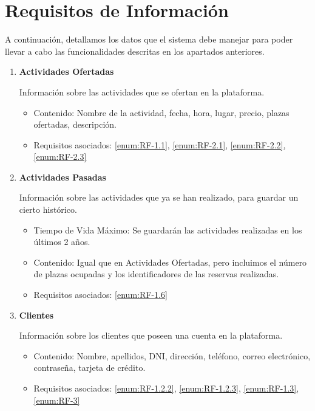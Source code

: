 \section{Requisitos de Información}



A continuación, detallamos los datos que el sistema debe manejar para poder llevar a cabo las funcionalidades descritas en los apartados anteriores.
\begin{enumerate}[label={\color{red}RI-\arabic{enumi}.}]
    \item \textbf{Actividades Ofertadas}
    
    Información sobre las actividades que se ofertan en la plataforma.
    \begin{itemize}
        \item {\color{violet}Contenido:} Nombre de la actividad, fecha, hora, lugar, precio, plazas ofertadas, descripción.
        \item {\color{violet}Requisitos asociados:} \ref{enum:RF-1.1}, \ref{enum:RF-2.1}, \ref{enum:RF-2.2}, \ref{enum:RF-2.3}
    \end{itemize}
    
    \item \textbf{Actividades Pasadas}
    
    Información sobre las actividades que ya se han realizado, para guardar un cierto histórico.
    \begin{itemize}
        \item {\color{violet}Tiempo de Vida Máximo:} Se guardarán las actividades realizadas en los últimos 2 años.
        \item {\color{violet}Contenido:} Igual que en Actividades Ofertadas, pero incluimos el número de plazas ocupadas y los identificadores de las reservas realizadas.
        \item {\color{violet}Requisitos asociados:} \ref{enum:RF-1.6}
    \end{itemize}

    \item \textbf{Clientes}
    
    Información sobre los clientes que poseen una cuenta en la plataforma.
    \begin{itemize}
        \item {\color{violet}Contenido:} Nombre, apellidos, DNI, dirección, teléfono, correo electrónico, contraseña, tarjeta de crédito.
        \item {\color{violet}Requisitos asociados:} \ref{enum:RF-1.2.2}, \ref{enum:RF-1.2.3}, \ref{enum:RF-1.3}, \ref{enum:RF-3}
    \end{itemize}


\end{enumerate}
